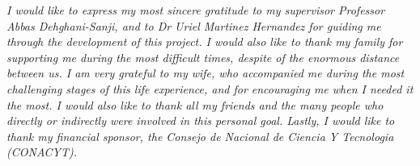 

\begin{acknowledgements}      %

\setlength{\parindent}{17.62482pt}
\setlength{\parskip}{0.0pt plus 1.0pt}

\textit{I would like to express my most sincere gratitude to my supervisor Professor Abbas Dehghani-Sanji, and to Dr Uriel Martinez Hernandez for guiding me through the development of this project. I would also like to thank my family for supporting me during the most difficult times, despite of the enormous distance between us. I am very grateful to my wife, who accompanied me during the most challenging stages of this life experience, and for encouraging me when I needed it the most. I would also like to thank all my friends and the many people who directly or indirectly were involved in this personal goal. Lastly, I would like to thank my financial sponsor, the Consejo de Nacional de Ciencia Y Tecnologia (CONACYT).}

\end{acknowledgements}


